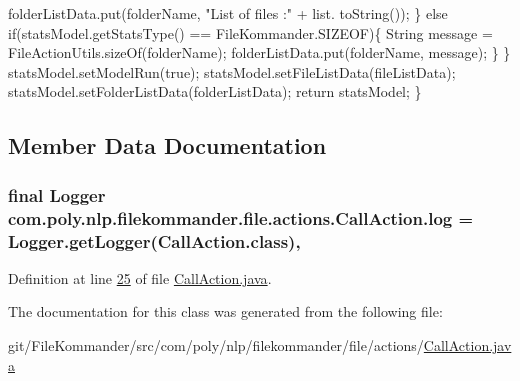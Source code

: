 \begin{DoxyCode}
                folderListData.put(folderName, \textcolor{stringliteral}{"List of files :"} + list.
      toString());
            \} \textcolor{keywordflow}{else} \textcolor{keywordflow}{if}(statsModel.getStatsType() == FileKommander.SIZEOF)\{
                String message = FileActionUtils.sizeOf(folderName);
                folderListData.put(folderName, message);
            \}
        \}
        statsModel.setModelRun(\textcolor{keyword}{true});
        statsModel.setFileListData(fileListData);
        statsModel.setFolderListData(folderListData);
        \textcolor{keywordflow}{return} statsModel;
    \}
\end{DoxyCode}


\subsection{Member Data Documentation}
\hypertarget{classcom_1_1poly_1_1nlp_1_1filekommander_1_1file_1_1actions_1_1_call_action_a65b722d9482bd93c3ae2b31f51050a08}{
\subsubsection[{log}]{\setlength{\rightskip}{0pt plus 5cm}final Logger com.\-poly.\-nlp.\-filekommander.\-file.\-actions.\-Call\-Action.\-log = Logger.\-get\-Logger(Call\-Action.\-class)\hspace{0.3cm}{\ttfamily [static]}, {\ttfamily [private]}}}\label{classcom_1_1poly_1_1nlp_1_1filekommander_1_1file_1_1actions_1_1_call_action_a65b722d9482bd93c3ae2b31f51050a08}


Definition at line \hyperlink{L25}{25} of file \hyperlink{}{Call\-Action.\-java}.



The documentation for this class was generated from the following file\-:\begin{DoxyCompactItemize}
\item 
git/\-File\-Kommander/src/com/poly/nlp/filekommander/file/actions/\hyperlink{_call_action_8java}{Call\-Action.\-java}\end{DoxyCompactItemize}

